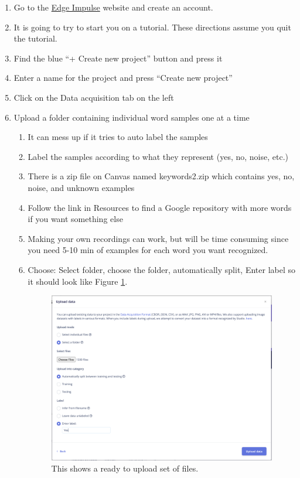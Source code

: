 \begin{enumerate}
  \item Go to the \href{https://edgeimpulse.com/}{Edge Impulse} website and create an 
account. 
  \item It is going to try to start you on a tutorial. These directions assume you quit 
      the tutorial.
  \item Find the blue ``+ Create new project'' button and press it 
  \item Enter a name for the project and press ``Create new project''
  \item Click on the Data acquisition tab on the left
  \item Upload a folder containing individual word samples one at a time
  \begin{enumerate}
    \item It can mess up if it tries to auto label the samples
    \item Label the samples according to what they represent (yes, no, noise, etc.)
    \item There is a zip file on Canvas named keywords2.zip which contains yes, no, noise, and unknown examples
    \item Follow the link in Resources to find a Google repository with more words if you want something else
    \item Making your own recordings can work, but will be time consuming since you need 5-10 min of examples 
            for each word you want recognized.
    \item Choose: Select folder, choose the folder, automatically split, Enter label so it should look 
            like Figure \ref{fig:edgeimpulseupload}.

  \begin{figure}[!htb]
    \centering
    \includegraphics[scale=0.3]{machineLearning/upload.png}
    \caption{This shows a ready to upload set of files.}
    \label{fig:edgeimpulseupload}
  \end{figure} 


\end{enumerate}
\end{enumerate}
